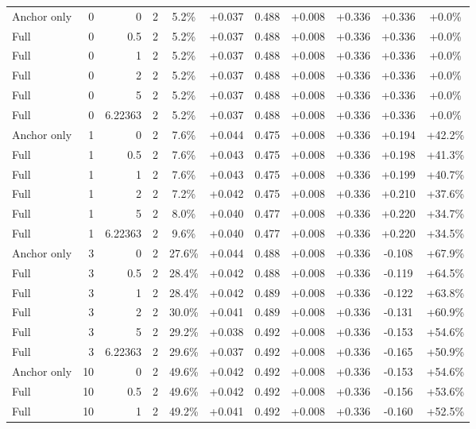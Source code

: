 \begin{table}[htbp]
\begin{tabular}{lrrrccccccc}
Anchor only & 0 & 0 & 2 & 5.2\% & +0.037 & 0.488 & +0.008 & +0.336 & +0.336 & +0.0\% \\
Full & 0 & 0.5 & 2 & 5.2\% & +0.037 & 0.488 & +0.008 & +0.336 & +0.336 & +0.0\% \\
Full & 0 & 1 & 2 & 5.2\% & +0.037 & 0.488 & +0.008 & +0.336 & +0.336 & +0.0\% \\
Full & 0 & 2 & 2 & 5.2\% & +0.037 & 0.488 & +0.008 & +0.336 & +0.336 & +0.0\% \\
Full & 0 & 5 & 2 & 5.2\% & +0.037 & 0.488 & +0.008 & +0.336 & +0.336 & +0.0\% \\
Full & 0 & 6.22363 & 2 & 5.2\% & +0.037 & 0.488 & +0.008 & +0.336 & +0.336 & +0.0\% \\
Anchor only & 1 & 0 & 2 & 7.6\% & +0.044 & 0.475 & +0.008 & +0.336 & +0.194 & +42.2\% \\
Full & 1 & 0.5 & 2 & 7.6\% & +0.043 & 0.475 & +0.008 & +0.336 & +0.198 & +41.3\% \\
Full & 1 & 1 & 2 & 7.6\% & +0.043 & 0.475 & +0.008 & +0.336 & +0.199 & +40.7\% \\
Full & 1 & 2 & 2 & 7.2\% & +0.042 & 0.475 & +0.008 & +0.336 & +0.210 & +37.6\% \\
Full & 1 & 5 & 2 & 8.0\% & +0.040 & 0.477 & +0.008 & +0.336 & +0.220 & +34.7\% \\
Full & 1 & 6.22363 & 2 & 9.6\% & +0.040 & 0.477 & +0.008 & +0.336 & +0.220 & +34.5\% \\
Anchor only & 3 & 0 & 2 & 27.6\% & +0.044 & 0.488 & +0.008 & +0.336 & -0.108 & +67.9\% \\
Full & 3 & 0.5 & 2 & 28.4\% & +0.042 & 0.488 & +0.008 & +0.336 & -0.119 & +64.5\% \\
Full & 3 & 1 & 2 & 28.4\% & +0.042 & 0.489 & +0.008 & +0.336 & -0.122 & +63.8\% \\
Full & 3 & 2 & 2 & 30.0\% & +0.041 & 0.489 & +0.008 & +0.336 & -0.131 & +60.9\% \\
Full & 3 & 5 & 2 & 29.2\% & +0.038 & 0.492 & +0.008 & +0.336 & -0.153 & +54.6\% \\
Full & 3 & 6.22363 & 2 & 29.6\% & +0.037 & 0.492 & +0.008 & +0.336 & -0.165 & +50.9\% \\
Anchor only & 10 & 0 & 2 & 49.6\% & +0.042 & 0.492 & +0.008 & +0.336 & -0.153 & +54.6\% \\
Full & 10 & 0.5 & 2 & 49.6\% & +0.042 & 0.492 & +0.008 & +0.336 & -0.156 & +53.6\% \\
Full & 10 & 1 & 2 & 49.2\% & +0.041 & 0.492 & +0.008 & +0.336 & -0.160 & +52.5\% \\

\end{tabular}
\end{table}
